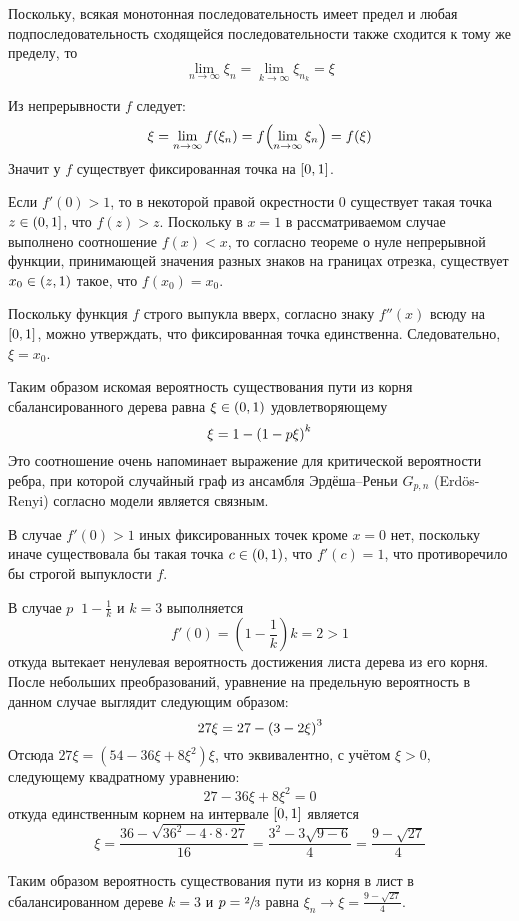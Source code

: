 \documentclass[a4paper]{article}
\let\originalleft\left
\let\originalright\right
\renewcommand{\left}{\mathopen{}\mathclose\bgroup\originalleft}
\renewcommand{\right}{\aftergroup\egroup\originalright}
\newcommand{\clo}[1]{{\left [ #1 \right ]}}
\newcommand{\ploc}[1]{{\left ( #1 \right ]}}
\newcommand{\brac}[1]{{\left ( #1 \right )}}
\newcommand{\defn}{{\mathop{\overset{\Delta}{=}}\nolimits}}
\newcommand{\eng}[1]{\foreignlanguage{english}{#1}}
\begin{document}
Поскольку, всякая монотонная последовательность имеет предел и
любая подпоследовательность сходящейся последовательности также
сходится к тому же пределу, то
\[\lim_{n\to \infty} \xi_n = \lim_{k\to \infty} \xi_{n_k} = \xi \]

Из непрерывности $f$ следует:
\[\xi = \lim_{n\to \infty} f(\xi_n) = f\brac{\lim_{n \to\infty}\xi_n} = f(\xi)\]
Значит у $f$ существует фиксированная точка на $\clo{0,1}$.

Если $f'(0)>1$, то в некоторой правой окрестности $0$ существует
такая точка $z\in\ploc{0,1}$, что $f(z)>z$. Поскольку в $x=1$ в
рассматриваемом случае выполнено соотношение $f(x)<x$, то согласно
теореме о нуле непрерывной функции, принимающей значения разных
знаков на границах отрезка, существует $x_0\in \brac{z,1}$ такое, что $f(x_0) = x_0$.

Поскольку функция $f$ строго выпукла вверх, согласно знаку $f''(x)$ всюду на $\clo{0,1}$, можно утверждать, что фиксированная точка единственна. Следовательно, $\xi=x_0$.

Таким образом искомая вероятность существования пути из корня
сбалансированного дерева равна $\xi\in \brac{0,1}$ удовлетворяющему
\[\xi = 1 - \brac{1 - p \xi }^k\]
Это соотношение очень напоминает выражение для критической
вероятности ребра, при которой случайный граф из ансамбля
Эрдёша–Реньи $G_{p,n}$ (\eng{Erd\"os-Renyi}) согласно модели
является связным.

В случае $f'(0)>1$ иных фиксированных точек кроме $x=0$ нет,
поскольку иначе существовала бы такая точка $c\in \brac{0,1}$,
что $f'(c)=1$, что противоречило бы строгой выпуклости $f$.

В случае $p\defn 1-\frac{1}{k}$ и $k=3$ выполняется
\[f'(0) = (1-\frac{1}{k}) k = 2 > 1 \]
откуда вытекает ненулевая вероятность достижения листа дерева из его
корня.
После небольших преобразований, уравнение на предельную вероятность
в данном случае выглядит следующим образом:
\[27 \xi = 27 - \brac{ 3 - 2 \xi }^3\]
Отсюда $27 \xi = ( 54 - 36 \xi + 8 \xi^2 )\xi$, что эквивалентно, с
учётом $\xi>0$, следующему квадратному уравнению:
\[27 - 36 \xi + 8 \xi^2 = 0\]
откуда единственным корнем на интервале $\clo{0,1}$ является
\[\xi = \frac{36 - \sqrt{ 36^2 - 4 \cdot 8\cdot 27}}{16}
= \frac{3^2 - 3 \sqrt{ 9-6 }}{4} = \frac{9 - \sqrt{ 27 }}{4}\]

Таким образом вероятность существования пути из корня в лист в
сбалансированном дереве $k=3$ и $p=\sfrac{2}{3}$ равна
$\xi_n \to \xi = \frac{9 - \sqrt{ 27 }}{4}$.

\end{document}
